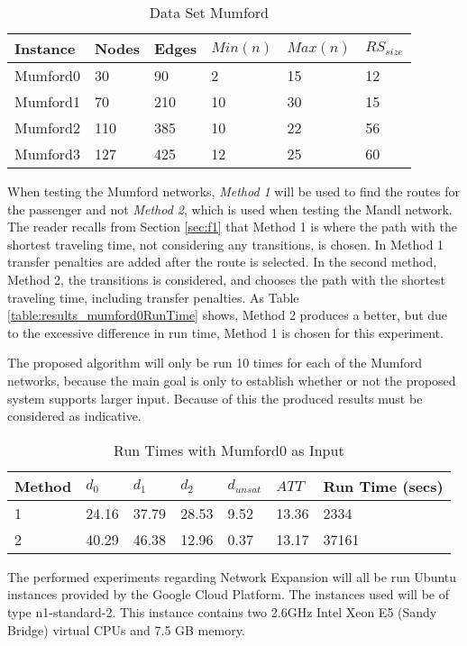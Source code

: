 \begin{table}[H]
	\centering
	\begin{tabular}{|l|l|l|l|l|l|}
    	\hline
    	Instance & Nodes&Edges & $Min(n)$ & $Max(n)$ & $RS_{size}$\\
    	\hline
   	    Mumford0 & 30&90 & 2&15 & 12 \\
   	    Mumford1 & 70&210 & 10&30 & 15 \\
   	    Mumford2 & 110&385 & 10&22 & 56 \\
   	    Mumford3 & 127&425 & 12&25 & 60 \\
   	    \hline
    \end{tabular}
    \caption{Data Set Mumford}
    \label{table:dataSet_mumford}
\end{table}

When testing the Mumford networks, \textit{Method 1} will be used to find the routes for the passenger and not \textit{Method 2}, which is used when testing the Mandl network. The reader recalls from Section \vref{sec:f1} that Method 1 is where the path with the shortest traveling time, not considering any transitions, is chosen. In Method 1 transfer penalties are added after the route is selected. In the second method, Method 2, the transitions is considered, and chooses the path with the shortest traveling time, including transfer penalties. As Table \vref{table:results_mumford0RunTime} shows, Method 2 produces a better, but due to the excessive difference in run time, Method 1 is chosen for this experiment. 

The proposed algorithm will only be run 10 times for each of the Mumford networks, because the main goal is only to establish whether or not the proposed system supports larger input. Because of this the produced results must be considered as indicative. 

\begin{table}[H]
    \centering
    \begin{tabular}{|l|l|l|l|l|l|l|}
        \hline
        Method & $d_0$ & $d_1$ & $d_2$ & $d_{unsat}$ & $ATT$ & Run Time (secs) \\
        \hline
        1 & 24.16 & 37.79 & 28.53 & 9.52 & 13.36 & 2334 \\
        2 & 40.29 & 46.38 & 12.96 & 0.37 & 13.17 & 37161 \\
        \hline
    \end{tabular}
    \caption{Run Times with Mumford0 as Input}
    \label{table:results_mumford0RunTime}
\end{table}

The performed experiments regarding Network Expansion will all be run Ubuntu instances provided by the Google Cloud Platform. The instances used will be of type n1-standard-2. This instance contains two 2.6GHz Intel Xeon E5 (Sandy Bridge) virtual CPUs and 7.5 GB memory\cite{website:google}.

